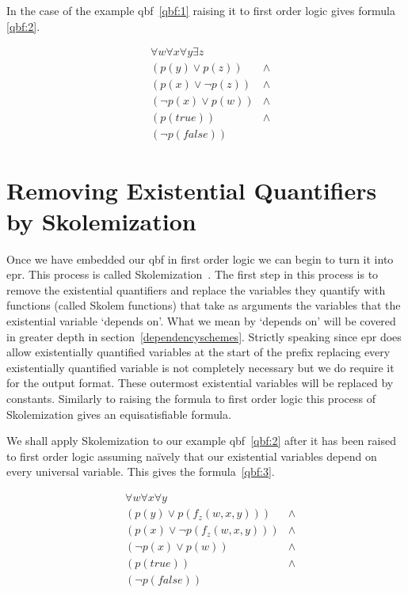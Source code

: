 In the case of the example \gls{qbf}~\ref{qbf:1} raising it to first order logic gives formula \ref{qbf:2}.

\begin{equation} \label{qbf:2}
\begin{aligned}
&\forall w \forall x \forall y \exists z\\
&(p(y) \lor p(z)) &\land\\
&(p(x) \lor \neg p(z)) &\land\\
&(\neg p(x) \lor p(w)) &\land\\
&(p(true)) &\land\\
&(\neg p(false))
\end{aligned}
\end{equation}

\section{Removing Existential Quantifiers by Skolemization} \label{skolemization}
Once we have embedded our \gls{qbf} in first order logic we can begin to turn it into \gls{epr}. This process is called Skolemization~\cite{skolemization}. The first step in this process is to remove the existential quantifiers and replace the variables they quantify with functions (called Skolem functions) that take as arguments the variables that the existential variable `depends on'. What we mean by `depends on' will be covered in greater depth in section~\ref{dependencyschemes}. Strictly speaking since \gls{epr} does allow existentially quantified variables at the start of the prefix replacing every existentially quantified variable is not completely necessary but we do require it for the output format. These outermost existential variables will be replaced by constants. Similarly to raising the formula to first order logic this process of Skolemization gives an equisatisfiable formula.

We shall apply Skolemization to our example \gls{qbf}~\ref{qbf:2} after it has been raised to first order logic assuming na{\"i}vely that our existential variables depend on every universal variable. This gives the formula~\ref{qbf:3}.

\begin{equation} \label{qbf:3}
\begin{aligned}
&\forall w \forall x \forall y\\
&(p(y) \lor p(f_z(w, x, y))) &\land\\
&(p(x) \lor \neg p(f_z(w, x, y))) &\land\\
&(\neg p(x) \lor p(w)) &\land\\
&(p(true)) &\land\\
&(\neg p(false))
\end{aligned}
\end{equation}

